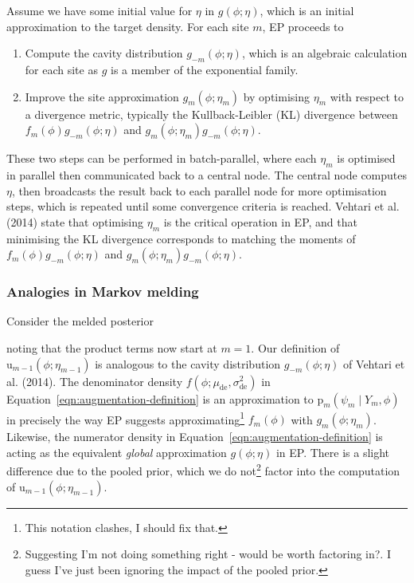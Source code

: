 \documentclass[10pt,a4paper,]{article}
\providecommand{\tightlist}{%
  \setlength{\itemsep}{0pt}\setlength{\parskip}{0pt}}
\let\rmarkdownfootnote\footnote%
\def\footnote{\protect\rmarkdownfootnote}
\newcommand{\pd}{\text{p}}
\newcommand{\tarw}{\text{u}}
\newcommand{\modelindex}{m}
\begin{document}
Assume we have some initial value for \(\eta\) in \(g(\phi; \eta)\),
which is an initial approximation to the target density. For each site
\(\modelindex\), EP proceeds to

\begin{enumerate}
\def\labelenumi{\arabic{enumi}.}
\tightlist
\item
  Compute the cavity distribution \(g_{-\modelindex}(\phi; \eta)\),
  which is an algebraic calculation for each site as \(g\) is a member
  of the exponential family.
\item
  Improve the site approximation
  \(g_{\modelindex}(\phi; \eta_{\modelindex})\) by optimising
  \(\eta_{\modelindex}\) with respect to a divergence metric, typically
  the Kullback-Leibler (KL) divergence between
  \(f_{\modelindex}(\phi) g_{-\modelindex}(\phi; \eta)\) and
  \(g_{\modelindex}(\phi; \eta_{\modelindex}) g_{-\modelindex}(\phi; \eta)\).
\end{enumerate}

These two steps can be performed in batch-parallel, where each
\(\eta_{\modelindex}\) is optimised in parallel then communicated back
to a central node. The central node computes \(\eta\), then broadcasts
the result back to each parallel node for more optimisation steps, which
is repeated until some convergence criteria is reached. Vehtari et al.
(2014) state that optimising \(\eta_{\modelindex}\) is the critical
operation in EP, and that minimising the KL divergence corresponds to
matching the moments of
\(f_{\modelindex}(\phi) g_{-\modelindex}(\phi; \eta)\) and
\(g_{\modelindex}(\phi; \eta_{\modelindex}) g_{-\modelindex}(\phi; \eta)\).

\subsubsection{Analogies in Markov
melding}\label{analogies-in-markov-melding}

Consider the melded posterior

noting that the product terms now start at \(\modelindex = 1\). Our
definition of \(\tarw_{\modelindex - 1}(\phi; \eta_{\modelindex - 1})\)
is analogous to the cavity distribution \(g_{-\modelindex}(\phi; \eta)\)
of Vehtari et al. (2014). The denominator density
\(f(\phi; \mu_{\text{de}}, \sigma^{2}_{\text{de}})\) in
Equation~\eqref{eqn:augmentation-definition} is an approximation to
\(\pd_{\modelindex}(\psi_{\modelindex} \mid Y_{\modelindex}, \phi)\) in
precisely the way EP suggests approximating\footnote{This notation
  clashes, I should fix that.} \(f_{\modelindex}(\phi)\) with
\(g_{\modelindex}(\phi; \eta_{\modelindex})\). Likewise, the numerator
density in Equation~\eqref{eqn:augmentation-definition} is acting as the
equivalent \emph{global} approximation \(g(\phi; \eta)\) in EP. There is
a slight difference due to the pooled prior, which we do not\footnote{Suggesting
  I'm not doing something right - would be worth factoring in?. I guess
  I've just been ignoring the impact of the pooled prior.} factor into
the computation of
\(\tarw_{\modelindex - 1}(\phi; \eta_{\modelindex - 1})\).
\end{document}
